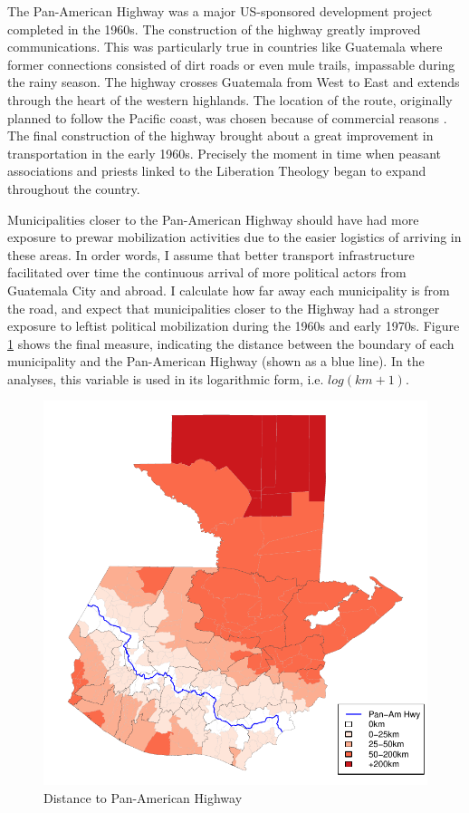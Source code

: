 \documentclass[12pt, notitlepage]{article}
\begin{document}
The Pan-American Highway was a major US-sponsored development project completed in the 1960s.
The construction of the highway greatly improved communications.
This was particularly true in countries like Guatemala where former connections consisted of dirt roads or even mule trails, impassable during the rainy season.
The highway crosses Guatemala from West to East and extends through the heart of the western highlands.
The location of the route, originally planned to follow the Pacific coast, was chosen because of commercial reasons \citep{Rutkow:2019aa}.
The final construction of the highway brought about a great improvement in transportation in the early 1960s.
Precisely the moment in time when peasant associations and priests linked to the Liberation Theology began to expand throughout the country.

Municipalities closer to the Pan-American Highway should have had more exposure to prewar mobilization activities due to the easier logistics of arriving in these areas.
In order words, I assume that better transport infrastructure facilitated over time the continuous arrival of more political actors from Guatemala City and abroad.
I calculate how far away each municipality is from the road, and expect that municipalities closer to the Highway had a stronger exposure to leftist political mobilization during the 1960s and early 1970s.
Figure \ref{fig:map_panam} shows the final measure, indicating the distance between the boundary of each municipality and the Pan-American Highway (shown as a blue line). In the analyses, this variable is used in its logarithmic form, i.e. $log(km + 1)$.

\begin{figure}[htb!]
  \centering
    \includegraphics[width = .4\textwidth]{img/map_panam}

  \caption{Distance to Pan-American Highway} \label{fig:map_panam}

\end{figure}
\end{document}
